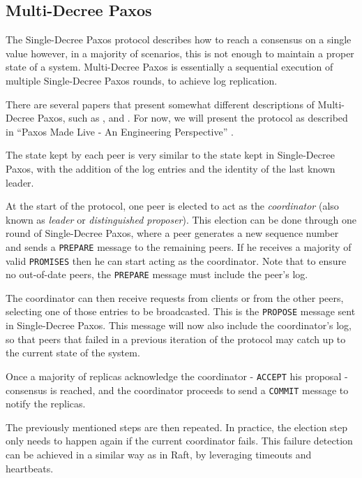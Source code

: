 \subsection{Multi-Decree Paxos}

The Single-Decree Paxos protocol describes how to reach a consensus on a single value however, in a majority of scenarios, this is not enough to maintain a proper state of a system. Multi-Decree Paxos is essentially a sequential execution of multiple Single-Decree Paxos rounds, to achieve log replication. 

There are several papers that present somewhat different descriptions of Multi-Decree Paxos, such as \cite{paxos_comple}, \cite{paxos_live} and \cite{paxos_vs_raft}. For now, we will present the protocol as described in “Paxos Made Live - An Engineering Perspective” \cite{paxos_live}.

The state kept by each peer is very similar to the state kept in Single-Decree Paxos, with the addition of the log entries and the identity of the last known leader.

At the start of the protocol, one peer is elected to act as the \textit{coordinator} (also known as \textit{leader} or \textit{distinguished proposer}). This election can be done through one round of Single-Decree Paxos, where a peer generates a new sequence number and sends a \texttt{PREPARE} message to the remaining peers. If he receives a majority of valid \texttt{PROMISES} then he can start acting as the coordinator. Note that to ensure no out-of-date peers, the \texttt{PREPARE} message must include the peer’s log.

The coordinator can then receive requests from clients or from the other peers, selecting one of those entries to be broadcasted. This is the \texttt{PROPOSE} message sent in Single-Decree Paxos. This message will now also include the coordinator’s log, so that peers that failed in a previous iteration of the protocol may catch up to the current state of the system.

Once a majority of replicas acknowledge the coordinator - \texttt{ACCEPT} his proposal - consensus is reached, and the coordinator proceeds to send a \texttt{COMMIT} message to notify the replicas.

\vspace{0.5cm}

The previously mentioned steps are then repeated. In practice, the election step only needs to happen again if the current coordinator fails. This failure detection can be achieved in a similar way as in Raft, by leveraging timeouts and heartbeats.

